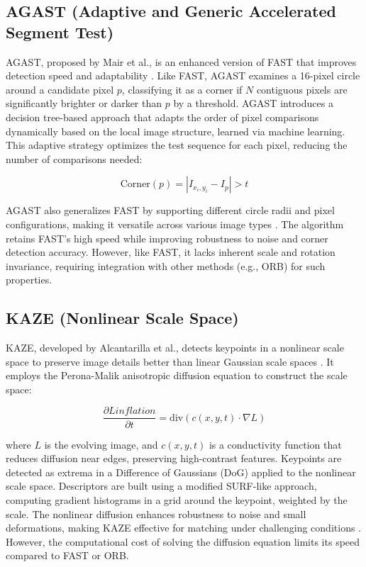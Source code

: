 \documentclass[journal]{IEEEtran}
\begin{document}
\subsection{AGAST (Adaptive and Generic Accelerated Segment Test)}
AGAST, proposed by Mair et al., is an enhanced version of FAST that improves detection speed and adaptability \cite{AGAST}. Like FAST, AGAST examines a 16-pixel circle around a candidate pixel \( p \), classifying it as a corner if \( N \) contiguous pixels are significantly brighter or darker than \( p \) by a threshold. AGAST introduces a decision tree-based approach that adapts the order of pixel comparisons dynamically based on the local image structure, learned via machine learning. This adaptive strategy optimizes the test sequence for each pixel, reducing the number of comparisons needed:

\begin{equation}
\text{Corner}(p) = \left| I_{x_i, y_i} - I_p \right| > t
\end{equation}

AGAST also generalizes FAST by supporting different circle radii and pixel configurations, making it versatile across various image types \cite{AGAST}. The algorithm retains FAST’s high speed while improving robustness to noise and corner detection accuracy. However, like FAST, it lacks inherent scale and rotation invariance, requiring integration with other methods (e.g., ORB) for such properties.\\

\subsection{KAZE (Nonlinear Scale Space)}
KAZE, developed by Alcantarilla et al., detects keypoints in a nonlinear scale space to preserve image details better than linear Gaussian scale spaces \cite{KAZE}. It employs the Perona-Malik anisotropic diffusion equation to construct the scale space:

\begin{equation}
\frac{\partial L inflation}{\partial t} = \text{div}(c(x, y, t) \cdot \nabla L)
\end{equation}

where \( L \) is the evolving image, and \( c(x, y, t) \) is a conductivity function that reduces diffusion near edges, preserving high-contrast features. Keypoints are detected as extrema in a Difference of Gaussians (DoG) applied to the nonlinear scale space. Descriptors are built using a modified SURF-like approach, computing gradient histograms in a grid around the keypoint, weighted by the scale. The nonlinear diffusion enhances robustness to noise and small deformations, making KAZE effective for matching under challenging conditions \cite{KAZE}. However, the computational cost of solving the diffusion equation limits its speed compared to FAST or ORB.\\
\end{document}
